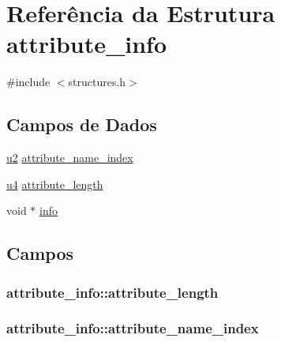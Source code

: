 \hypertarget{structattribute__info}{}\section{Referência da Estrutura attribute\+\_\+info}
\label{structattribute__info}


{\ttfamily \#include $<$structures.\+h$>$}

\subsection*{Campos de Dados}
\begin{DoxyCompactItemize}
\item 
\hyperlink{lista__operandos_8h_a732cde1300aafb73b0ea6c2558a7a54f}{u2} \hyperlink{structattribute__info_a19df9d4b42eb55ca5dc1bed98df89378}{attribute\+\_\+name\+\_\+index}
\item 
\hyperlink{lista__operandos_8h_ae5be1f726785414dd1b77d60df074c9d}{u4} \hyperlink{structattribute__info_a1ed8f679458c4bb0ed3315721588f50d}{attribute\+\_\+length}
\item 
void $\ast$ \hyperlink{structattribute__info_a7f168925308e418b7b44c9f11fdf42ae}{info}
\end{DoxyCompactItemize}


\subsection{Campos}
\subsubsection[{\texorpdfstring{attribute\+\_\+length}{attribute_length}}]{ attribute\+\_\+info\+::attribute\+\_\+length}\hypertarget{structattribute__info_a1ed8f679458c4bb0ed3315721588f50d}{}\label{structattribute__info_a1ed8f679458c4bb0ed3315721588f50d}
\subsubsection[{\texorpdfstring{attribute\+\_\+name\+\_\+index}{attribute_name_index}}]{ attribute\+\_\+info\+::attribute\+\_\+name\+\_\+index}\hypertarget{structattribute__info_a19df9d4b42eb55ca5dc1bed98df89378}{}\label{structattribute__info_a19df9d4b42eb55ca5dc1bed98df89378}
